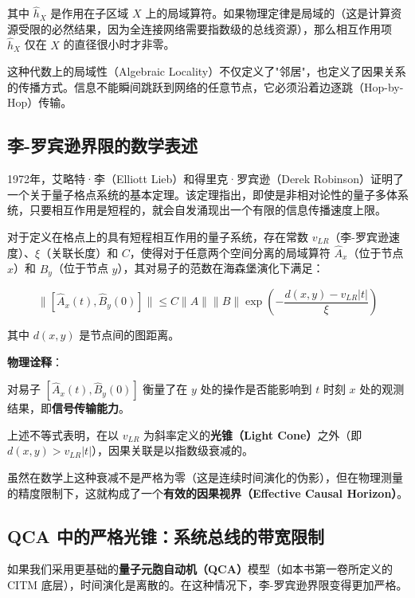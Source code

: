 其中 $\hat{h}_X$ 是作用在子区域 $X$ 上的局域算符。如果物理定律是局域的（这是计算资源受限的必然结果，因为全连接网络需要指数级的总线资源），那么相互作用项 $\hat{h}_X$ 仅在 $X$ 的直径很小时才非零。

这种代数上的局域性（Algebraic Locality）不仅定义了"邻居"，也定义了因果关系的传播方式。信息不能瞬间跳跃到网络的任意节点，它必须沿着边逐跳（Hop-by-Hop）传输。

\subsection{李-罗宾逊界限的数学表述}

1972年，艾略特·李（Elliott Lieb）和得里克·罗宾逊（Derek Robinson）证明了一个关于量子格点系统的基本定理。该定理指出，即使是非相对论性的量子多体系统，只要相互作用是短程的，就会自发涌现出一个有限的信息传播速度上限。

\begin{theorem}[李-罗宾逊界限]
对于定义在格点上的具有短程相互作用的量子系统，存在常数 $v_{LR}$（李-罗宾逊速度）、$\xi$（关联长度）和 $C$，使得对于任意两个空间分离的局域算符 $\hat{A}_x$（位于节点 $x$）和 $\hat{B}_y$（位于节点 $y$），其对易子的范数在海森堡演化下满足：

\begin{equation}
\| [\hat{A}_x(t), \hat{B}_y(0)] \| \le C \|A\| \|B\| \exp\left( -\frac{d(x,y) - v_{LR}|t|}{\xi} \right)
\end{equation}

其中 $d(x,y)$ 是节点间的图距离。
\end{theorem}

\textbf{物理诠释}：

对易子 $[\hat{A}_x(t), \hat{B}_y(0)]$ 衡量了在 $y$ 处的操作是否能影响到 $t$ 时刻 $x$ 处的观测结果，即\textbf{信号传输能力}。

上述不等式表明，在以 $v_{LR}$ 为斜率定义的\textbf{光锥（Light Cone）}之外（即 $d(x,y) > v_{LR}|t|$），因果关联是以指数级衰减的。

虽然在数学上这种衰减不是严格为零（这是连续时间演化的伪影），但在物理测量的精度限制下，这就构成了一个\textbf{有效的因果视界（Effective Causal Horizon）}。

\subsection{QCA 中的严格光锥：系统总线的带宽限制}

如果我们采用更基础的\textbf{量子元胞自动机（QCA）}模型（如本书第一卷所定义的 CITM 底层），时间演化是离散的。在这种情况下，李-罗宾逊界限变得更加严格。

